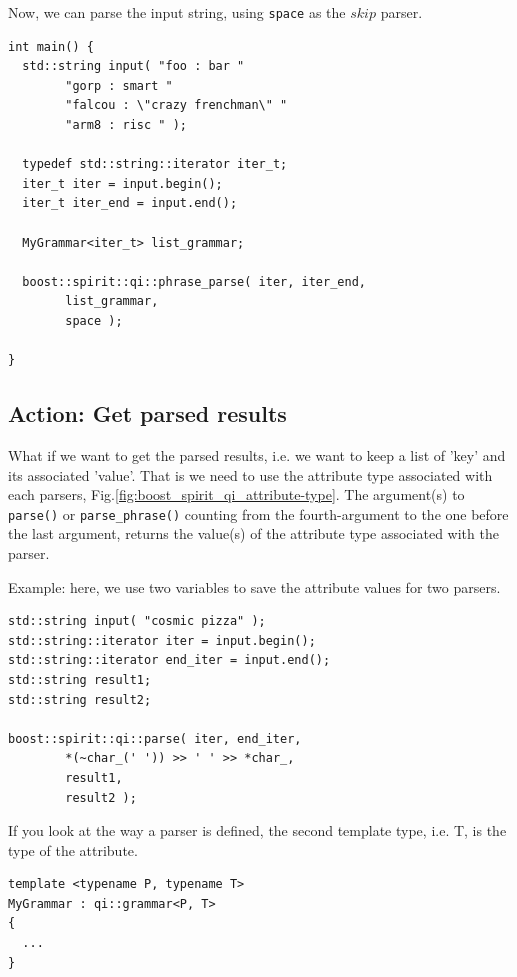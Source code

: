 Now, we  can parse the input string, using \verb!space! as the $skip$ parser.
\begin{verbatim}
int main() {
  std::string input( "foo : bar "
		"gorp : smart "
		"falcou : \"crazy frenchman\" "
		"arm8 : risc " );

  typedef std::string::iterator iter_t;
  iter_t iter = input.begin();
  iter_t iter_end = input.end();

  MyGrammar<iter_t> list_grammar;

  boost::spirit::qi::phrase_parse( iter, iter_end,
        list_grammar,
        space );
		
}
\end{verbatim}



\subsection{Action: Get parsed results}

What if we want to get the parsed results, i.e. we want to keep a list of
'key' and its associated 'value'. That is we need to use the attribute type
associated with each parsers, Fig.\ref{fig:boost_spirit_qi_attribute-type}. The
argument(s) to \verb!parse()! or \verb!parse_phrase()! counting from the
fourth-argument to the one before the last argument, returns the value(s) of the
attribute type associated with the parser.  

Example: here, we use two variables to save the attribute values for two
parsers.

\begin{verbatim}
std::string input( "cosmic pizza" );
std::string::iterator iter = input.begin();
std::string::iterator end_iter = input.end();
std::string result1;
std::string result2;

boost::spirit::qi::parse( iter, end_iter,
		*(~char_(' ')) >> ' ' >> *char_,
		result1,
		result2 );

\end{verbatim}



If you look at the way a parser is defined, the second template type, i.e. T, is
the type of the attribute.
\begin{verbatim}
template <typename P, typename T>
MyGrammar : qi::grammar<P, T> 
{
  ...
}
\end{verbatim}

